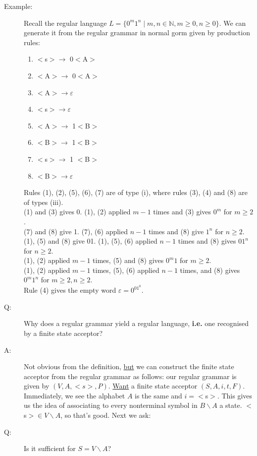 \documentclass[10pt]{article}
\begin{document}
\begin{description}
		\item[Example:] Recall the regular language $L = \{0^m1^n \mid m, n \in \mathbb{N}, m \geq 0, n \geq 0 \}$. We can generate it from the regular grammar in normal gorm given by production rules:
		\begin{enumerate}
			\item $<$s$> \rightarrow$ 0$<$A$>$
			\item $<$A$> \rightarrow$ 0$<$A$>$
			\item $<$A$> \rightarrow \varepsilon$
			\item $<$s$> \rightarrow \varepsilon$
			\item $<$A$> \rightarrow$ 1$<$B$>$
			\item $<$B$> \rightarrow$ 1$<$B$>$
			\item $<$s$> \rightarrow$ 1 $<$B$>$
			\item $<$B$> \rightarrow \varepsilon$
		\end{enumerate}
		Rules (1), (2), (5), (6), (7) are of type (i), where rules (3), (4) and (8) are of types (iii). \\
		(1) and (3) gives 0. (1), (2) applied $m-1$ times and (3) gives $0^m$ for $m \geq 2$. \\
		(7) and (8) give 1. (7), (6) applied $n-1$ times and (8) give $1^n$ for $n \geq 2$. \\
		(1), (5) and (8) give 01. (1), (5), (6) applied $n-1$ times and (8) gives $01^n$ for $n \geq 2$. \\
		(1), (2) applied $m-1$ times, (5) and (8) gives $0^m1$ for $m \geq 2$. \\
		(1), (2) applied $m-1$ times, (5), (6) applied $n-1$ times, and (8) gives $0^m1^n$ for $m \geq 2, n \geq 2$. \\
		Rule (4) gives the empty word $\varepsilon = 0^01^0$.
		\item[Q:] Why does a regular grammar yield a regular language, \textbf{i.e.} one recognised by a finite state acceptor?
		\item[A:] Not obvious from the definition, \underline{but} we can construct the finite state acceptor from the regular grammar as follows: our regular grammar is given by $(V, A, {<}s{>}, P)$.  \underline{Want} a finite state acceptor $(S, A, i, t, F)$. Immediately, we see the alphabet $A$ is the same and $i=<$s$>$. This gives us the idea of associating to every nonterminal symbol in $B \backslash A$ a state. $<$s$> \in V \backslash A$, so that's good. Next we ask:
		\item[Q:] Is it sufficient for $S = V \backslash A$?

\end{description}
\end{document}
